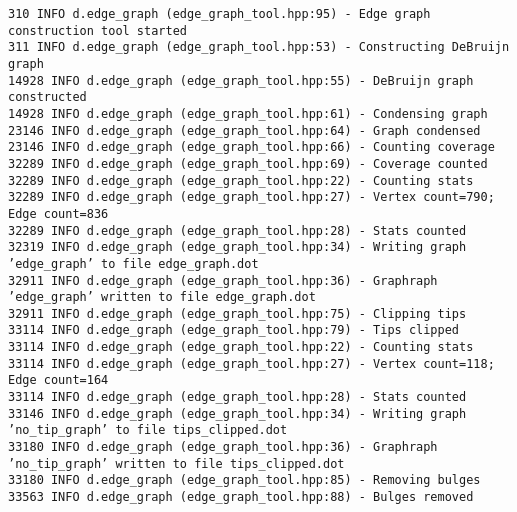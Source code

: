 \documentclass[14pt]{article}
\begin{document}
\noindent\scriptsize{\texttt{310  INFO d.edge\_graph (edge\_graph\_tool.hpp:95) - Edge graph construction tool started \\
    311  INFO d.edge\_graph (edge\_graph\_tool.hpp:53) - Constructing DeBruijn graph \\
  14928  INFO d.edge\_graph (edge\_graph\_tool.hpp:55) - DeBruijn graph constructed \\
  14928  INFO d.edge\_graph (edge\_graph\_tool.hpp:61) - Condensing graph \\
  23146  INFO d.edge\_graph (edge\_graph\_tool.hpp:64) - Graph condensed \\
  23146  INFO d.edge\_graph (edge\_graph\_tool.hpp:66) - Counting coverage \\
  32289  INFO d.edge\_graph (edge\_graph\_tool.hpp:69) - Coverage counted \\
  32289  INFO d.edge\_graph (edge\_graph\_tool.hpp:22) - Counting stats \\
  32289  INFO d.edge\_graph (edge\_graph\_tool.hpp:27) - Vertex count=790; Edge count=836 \\
  32289  INFO d.edge\_graph (edge\_graph\_tool.hpp:28) - Stats counted \\
  32319  INFO d.edge\_graph (edge\_graph\_tool.hpp:34) - Writing graph 'edge\_graph' to file edge\_graph.dot \\
  32911  INFO d.edge\_graph (edge\_graph\_tool.hpp:36) - Graphraph 'edge\_graph' written to file edge\_graph.dot \\
  32911  INFO d.edge\_graph (edge\_graph\_tool.hpp:75) - Clipping tips \\
  33114  INFO d.edge\_graph (edge\_graph\_tool.hpp:79) - Tips clipped \\
  33114  INFO d.edge\_graph (edge\_graph\_tool.hpp:22) - Counting stats \\
  33114  INFO d.edge\_graph (edge\_graph\_tool.hpp:27) - Vertex count=118; Edge count=164 \\
  33114  INFO d.edge\_graph (edge\_graph\_tool.hpp:28) - Stats counted \\
  33146  INFO d.edge\_graph (edge\_graph\_tool.hpp:34) - Writing graph 'no\_tip\_graph' to file tips\_clipped.dot \\
  33180  INFO d.edge\_graph (edge\_graph\_tool.hpp:36) - Graphraph 'no\_tip\_graph' written to file tips\_clipped.dot \\
  33180  INFO d.edge\_graph (edge\_graph\_tool.hpp:85) - Removing bulges \\
  33563  INFO d.edge\_graph (edge\_graph\_tool.hpp:88) - Bulges removed \\
}}
\end{document}
